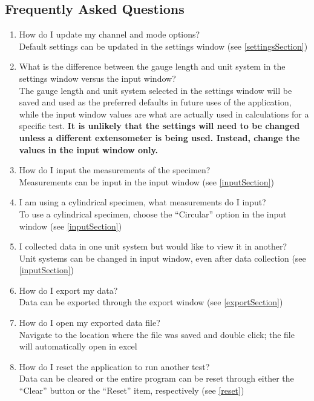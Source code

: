 \documentclass[12pt,letterpaper, USenglish]{article}
\theoremstyle{definition}
\numberwithin{theorem}{section}
\numberwithin{lemma}{section}
\numberwithin{corollary}{section}
\numberwithin{definition}{section}
\numberwithin{example}{section}
\numberwithin{equation}{theorem}
\begin{document}
\subsection{Frequently Asked Questions}
\begin{enumerate}
    \item How do I update my channel and mode options?\\ 
    Default settings can be updated in the settings window (see \ref{settingsSection})
    \item What is the difference between the gauge length and unit system in the settings window versus the input window?\\
    The gauge length and unit system selected in the settings window will be saved and used as the preferred defaults in future uses of the application, while the input window values are what are actually used in calculations for a specific test. \textbf{It is unlikely that the settings will need to be changed unless a different extensometer is being used. Instead, change the values in the input window only.}
    \item How do I input the measurements of the specimen?\\
    Measurements can be input in the input window (see \ref{inputSection})
    \item I am using a cylindrical specimen, what measurements do I input?\\
    To use a cylindrical specimen, choose the ``Circular'' option in the input window (see \ref{inputSection})
    \item I collected data in one unit system but would like to view it in another? \\
    Unit systems can be changed in input window, even after data collection (see \ref{inputSection})
    \item How do I export my data?\\
    Data can be exported through the export window (see \ref{exportSection})
    \item How do I open my exported data file?\\
    Navigate to the location where the file was saved and double click; the file will automatically open in excel 
    \item How do I reset the application to run another test? \\
    Data can be cleared or the entire program can be reset through either the ``Clear'' button or the ``Reset'' item, respectively (see \ref{reset})
\end{enumerate}
\end{document}
